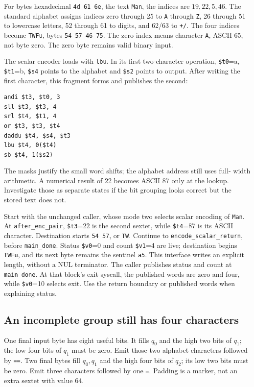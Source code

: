 For bytes hexadecimal \texttt{4d 61 6e}, the text \texttt{Man}, the indices are
$19,22,5,46$. The standard alphabet assigns indices zero through 25 to
\texttt{A} through \texttt{Z}, 26 through 51 to lowercase letters, 52 through
61 to digits, and 62/63 to \texttt{+/}. The four indices become
\texttt{TWFu}, bytes \texttt{54 57 46 75}. The zero index means character
\texttt{A}, ASCII 65, not byte zero. The zero byte remains valid binary input.



The scalar encoder loads with \texttt{lbu}. In its first two-character operation,
\texttt{\$t0}=a, \texttt{\$t1}=b, \texttt{\$s4} points to the alphabet and
\texttt{\$s2} points to output. After writing the first character, this fragment
forms and publishes the second:
\begin{verbatim}
andi $t3, $t0, 3
sll $t3, $t3, 4
srl $t4, $t1, 4
or $t3, $t3, $t4
daddu $t4, $s4, $t3
lbu $t4, 0($t4)
sb $t4, 1($s2)
\end{verbatim}
The masks justify the small word shifts; the alphabet address still uses full-
width arithmetic. A numerical result of 22 becomes ASCII 87 only at the lookup.
Investigate those as separate states if the bit grouping looks correct but the
stored text does not.

Start with the unchanged caller, whose mode two selects scalar encoding of
\texttt{Man}. At \texttt{after\_enc\_pair}, \texttt{\$t3}=22 is the second
sextet, while \texttt{\$t4}=87 is its ASCII character. Destination starts
\texttt{54 57}, or \texttt{TW}. Continue to \texttt{encode\_scalar\_return}, before
\texttt{main\_done}. Status \texttt{\$v0}=0 and count \texttt{\$v1}=4 are
live; destination begins \texttt{TWFu}, and its next byte remains the sentinel
\texttt{a5}. This interface writes an explicit length, without a NUL terminator.
The caller publishes status and count at \texttt{main\_done}. At that block's
exit syscall, the published words are zero and four, while \texttt{\$v0}=10
selects exit. Use the return boundary or published words when explaining status.

\subsection*{An incomplete group still has four characters}

One final input byte has eight useful bits. It fills $q_0$ and the high two bits
of $q_1$; the low four bits of $q_1$ must be zero. Emit those two alphabet
characters followed by \texttt{==}. Two final bytes fill $q_0,q_1$ and the high
four bits of $q_2$; its low two bits must be zero. Emit three characters followed
by one \texttt{=}. Padding is a marker, not an extra sextet with value 64.

